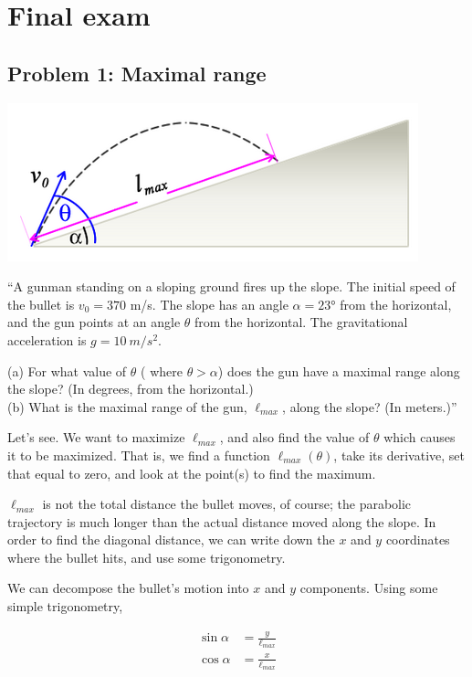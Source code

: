\documentclass[8.01x]{subfiles}
\begin{document}
\chapter{Final exam}

\section{Problem 1: Maximal range}

\begin{center}
\includegraphics[scale=0.65]{Graphics/finalexam_p1}
\end{center}

``A gunman standing on a sloping ground fires up the slope. The initial speed of the bullet is $v_0 = 370$ m/s. The slope has an angle $\alpha = \ang{23}$ from the horizontal, and the gun points at an angle $\theta$ from the horizontal. The gravitational acceleration is $g = \SI{10}{m/s^2}$.

(a) For what value of $\theta$ ( where $\theta>\alpha$) does the gun have a maximal range along the slope? (In degrees, from the horizontal.)\\
(b) What is the maximal range of the gun, $\ell_{max}$, along the slope? (In meters.)''

Let's see. We want to maximize $\ell_{max}$, and also find the value of $\theta$ which causes it to be maximized. That is, we find a function $\ell_{max}(\theta)$, take its derivative, set that equal to zero, and look at the point(s) to find the maximum.

$\ell_{max}$ is not the total distance the bullet moves, of course; the parabolic trajectory is much longer than the actual distance moved along the slope. In order to find the diagonal distance, we can write down the $x$ and $y$ coordinates where the bullet hits, and use some trigonometry.

We can decompose the bullet's motion into $x$ and $y$ components. Using some simple trigonometry,

\begin{align}
\sin \alpha &= \frac{y}{\ell_{max}}\\
\cos \alpha &= \frac{x}{\ell_{max}}
\end{align}
\end{document}
